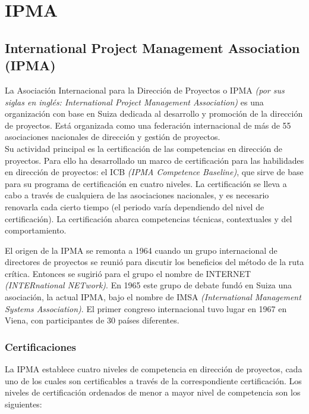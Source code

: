 \section{IPMA}

\subsection{International Project Management Association (IPMA)}

La Asociación Internacional para la Dirección de Proyectos o IPMA \emph{(por sus siglas en inglés: International Project Management Association)} es una organización con base en Suiza dedicada al desarrollo y promoción de la dirección de proyectos. Está organizada como una federación internacional de más de 55 asociaciones nacionales de dirección y gestión de proyectos.\\

Su actividad principal es la certificación de las competencias en dirección de proyectos. Para ello ha desarrollado un marco de certificación para las habilidades en dirección de proyectos: el ICB \emph{(IPMA Competence Baseline)}, que sirve de base para su programa de certificación en cuatro niveles. La certificación se lleva a cabo a través de cualquiera de las asociaciones nacionales, y es necesario renovarla cada cierto tiempo (el periodo varía dependiendo del nivel de certificación). La certificación abarca competencias técnicas, contextuales y del comportamiento.

El origen de la IPMA se remonta a 1964 cuando un grupo internacional de directores de proyectos se reunió para discutir los beneficios del método de la ruta crítica. Entonces se sugirió para el grupo el nombre de INTERNET \emph{(INTERnational NETwork)}. En 1965 este grupo de debate fundó en Suiza una asociación, la actual IPMA, bajo el nombre de IMSA \emph{(International Management Systems Association)}. El primer congreso internacional tuvo lugar en 1967 en Viena, con participantes de 30 países diferentes.

\subsubsection{Certificaciones}

La IPMA establece cuatro niveles de competencia en dirección de proyectos, cada uno de los cuales son certificables a través de la correspondiente certificación. Los niveles de certificación ordenados de menor a mayor nivel de competencia son los siguientes:\\

